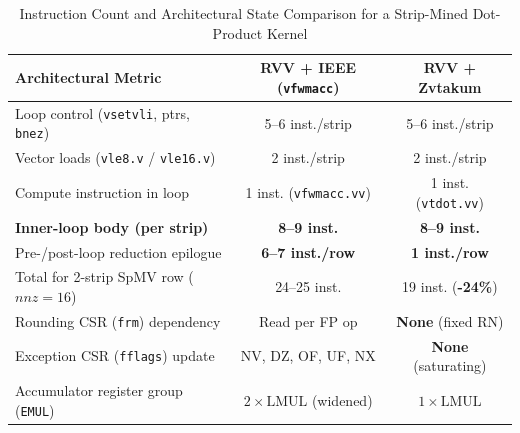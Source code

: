 \documentclass[conference]{IEEEtran}
\begin{document}
\begin{table}[htbp]
\centering
\caption{Instruction Count and Architectural State Comparison for a Strip-Mined Dot-Product Kernel}
\label{tab:isa_comparison}
\begin{tabular}{lcc}
\hline
\textbf{Architectural Metric} & \textbf{RVV + IEEE (\texttt{vfwmacc})} & \textbf{RVV + Zvtakum} \\
\hline
Loop control (\texttt{vsetvli}, ptrs, \texttt{bnez}) & 5--6 inst./strip & 5--6 inst./strip \\
Vector loads (\texttt{vle8.v} / \texttt{vle16.v}) & 2 inst./strip & 2 inst./strip \\
Compute instruction in loop & 1 inst. (\texttt{vfwmacc.vv}) & 1 inst. (\texttt{vtdot.vv}) \\
\textbf{Inner-loop body (per strip)} & \textbf{8--9 inst.} & \textbf{8--9 inst.} \\
\hline
Pre-/post-loop reduction epilogue & \textbf{6--7 inst./row} & \textbf{1 inst./row} \\
Total for 2-strip SpMV row ($nnz=16$) & 24--25 inst. & 19 inst. (\textbf{-24\%}) \\
\hline
Rounding CSR (\texttt{frm}) dependency & Read per FP op & \textbf{None} (fixed RN) \\
Exception CSR (\texttt{fflags}) update & NV, DZ, OF, UF, NX & \textbf{None} (saturating) \\
Accumulator register group (\texttt{EMUL}) & $2\times \text{LMUL}$ (widened) & $1\times \text{LMUL}$ \\
\hline
\end{tabular}
\end{table}
\end{document}
